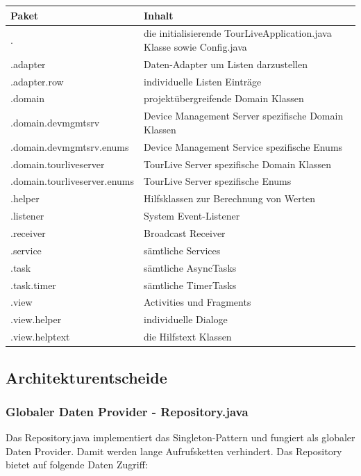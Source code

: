 \begin{longtable}{p{5.0cm} | p{7.1cm}}
\textbf{Paket} & \textbf{Inhalt} \\
\hline \hline 
. & die initialisierende TourLiveApplication.java Klasse sowie Config.java \\ 
\hline 
.adapter & Daten-Adapter um Listen darzustellen \\ 
\hline 
.adapter.row & individuelle Listen Einträge \\ 
\hline 
.domain & projektübergreifende Domain Klassen \\ 
\hline 
.domain.devmgmtsrv & Device Management Server spezifische Domain Klassen \\ 
\hline 
.domain.devmgmtsrv.enums & Device Management Service spezifische Enums \\ 
\hline 
.domain.tourliveserver & TourLive Server spezifische Domain Klassen \\ 
\hline 
.domain.tourliveserver.enums & TourLive Server spezifische Enums \\  
\hline 
.helper & Hilfsklassen zur Berechnung von Werten \\ 
\hline 
.listener & System Event-Listener \\ 
\hline 
.receiver & Broadcast Receiver \\ 
\hline 
.service & sämtliche Services \\ 
\hline 
.task & sämtliche AsyncTasks \\ 
\hline 
.task.timer & sämtliche TimerTasks \\ 
\hline 
.view & Activities und Fragments \\ 
\hline 
.view.helper & individuelle Dialoge \\ 
\hline 
.view.helptext & die Hilfstext Klassen \\ 
\hline 
\end{longtable} 

\subsection{Architekturentscheide}

\subsubsection{Globaler Daten Provider - Repository.java}
Das Repository.java implementiert das Singleton-Pattern und fungiert als globaler Daten Provider. Damit werden lange Aufrufsketten verhindert. Das Repository bietet auf folgende Daten Zugriff:

